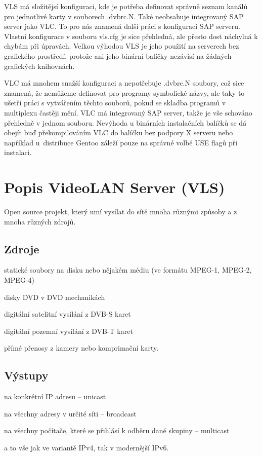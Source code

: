 VLS má složitějsí konfiguraci, kde je potřeba definovat správně seznam kanálů pro jednotlivé karty v souborech .dvbrc.N. Také neobsahuje integrovaný SAP server jako VLC. To pro nás znamená další práci s konfigurací SAP serveru. Vlastní konfigurace v souboru vls.cfg je sice přehledná, ale přesto dost náchylná k chybám při úpravách. Velkou výhodou VLS je jeho použití na serverech bez grafického prostředí, protože ani jeho binární balíčky nezávisí na žádných grafických knihovnách.

VLC má mnohem snažší konfiguraci a nepotřebuje .dvbrc.N soubory, což sice znamená, že nemůžeme definovat pro programy symbolické názvy, ale taky to ušetří práci s vytvářením těchto souborů, pokud se skladba programů v multiplexu častěji mění. VLC má integrovaný SAP server, takže je vše schováno přehledně v jednom souboru. Nevýhoda u binárních instalačních balíčků se dá obejít buď překompilováním VLC do balíčku bez podpory X serveru nebo například u~distribuce Gentoo záleží pouze na správné volbě USE flagů při instalaci.

\section{Popis VideoLAN Server (VLS)}
Open source projekt, který umí vysílat do sítě mnoha různými způsoby a z mnoha různých zdrojů.

\subsection{Zdroje}
\bitem
\item statické soubory na disku nebo nějakém médiu (ve formátu MPEG-1, MPEG-2, MPEG-4)
\item disky DVD v DVD mechanikách
\item digitální satelitní vysílání z DVB-S karet
\item digitální pozemní vysílání z DVB-T karet
\item přímé přenosy z kamery nebo komprimační karty.
\eitem

\subsection{Výstupy}
\bitem
\item na konkrétní IP adresu -- unicast
\item na všechny adresy v určité síti -- broadcast
\item na všechny počítače, které se přihlásí k odběru dané skupiny -- multicast
\item a to vše jak ve variantě IPv4, tak v modernější IPv6.
\eitem

